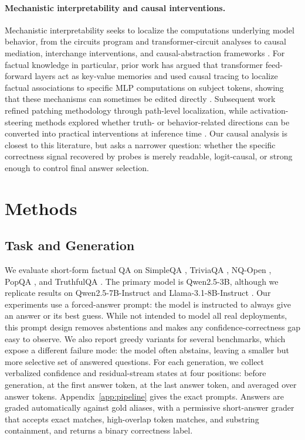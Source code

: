 \documentclass{article}
\begin{document}
\paragraph{Mechanistic interpretability and causal interventions.}
Mechanistic interpretability seeks to localize the computations underlying model behavior, from the circuits program and transformer-circuit analyses to causal mediation, interchange interventions, and causal-abstraction frameworks \cite{Olah2020ZoomIn, Elhage2021MathematicalFramework, Vig2020CausalMediation, Geiger2021CausalAbstractions, geiger2025causal}. For factual knowledge in particular, prior work has argued that transformer feed-forward layers act as key-value memories and used causal tracing to localize factual associations to specific MLP computations on subject tokens, showing that these mechanisms can sometimes be edited directly \cite{geva-etal-2021-transformer, meng2022locating}. Subsequent work refined patching methodology through path-level localization, while activation-steering methods explored whether truth- or behavior-related directions can be converted into practical interventions at inference time \cite{goldowsky2023localizing, zhang2024towards, turner2023steering, li2023inference}. Our causal analysis is closest to this literature, but asks a narrower question: whether the specific correctness signal recovered by probes is merely readable, logit-causal, or strong enough to control final answer selection. 

\section{Methods}

\subsection{Task and Generation}

We evaluate short-form factual QA on SimpleQA \citep{wei2024measuring}, TriviaQA \citep{joshi2017triviaqa}, NQ-Open \citep{kamalloo2023evaluating}, PopQA \citep{mallen2023not}, and TruthfulQA \citep{Lin2022TruthfulQA:Falsehoods}. The primary model is Qwen2.5-3B, although we replicate results on Qwen2.5-7B-Instruct \citep{yang2025qwen3} and Llama-3.1-8B-Instruct \citep{grattafiori2024llama}. Our experiments use a forced-answer prompt: the model is instructed to always give an answer or its best guess. While not intended to model all real deployments, this prompt design removes abstentions and makes any confidence-correctness gap easy to observe. We also report greedy variants for several benchmarks, which expose a different failure mode: the model often abstains, leaving a smaller but more selective set of answered questions.
For each generation, we collect verbalized confidence and residual-stream states at four positions: before generation, at the first answer token, at the last answer token, and averaged over answer tokens. Appendix~\ref{app:pipeline} gives the exact prompts. Answers are graded automatically against gold aliases, with a permissive
short-answer grader that accepts exact matches, high-overlap token matches, and substring containment, and returns a binary correctness label.
\end{document}
